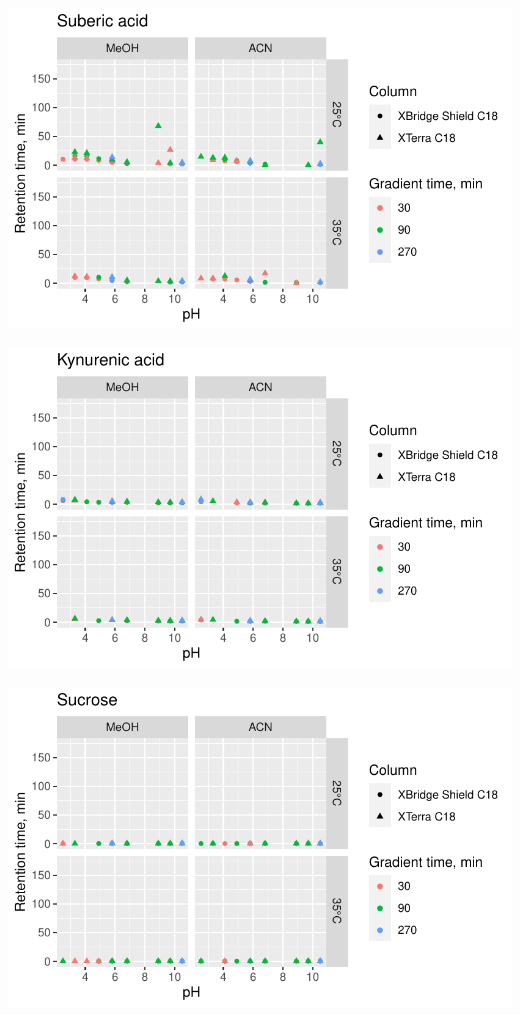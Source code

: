 \documentclass[
  letterpaper,
  DIV=11,
  numbers=noendperiod]{scrreprt}
\begin{document}
\includegraphics{index_files/figure-pdf/unnamed-chunk-4-156.pdf}

\includegraphics{index_files/figure-pdf/unnamed-chunk-4-157.pdf}

\includegraphics{index_files/figure-pdf/unnamed-chunk-4-158.pdf}
\end{document}
